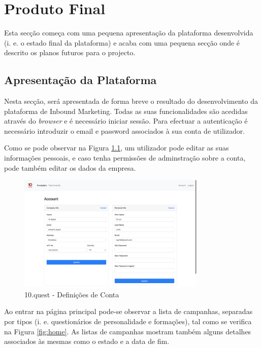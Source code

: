 \chapter{Produto Final}
\label{sec:produto-final}

Esta secção começa com uma pequena apresentação da plataforma desenvolvida (i. e. o estado final da plataforma) e acaba com uma pequena secção onde é descrito os planos futuros para o projecto.


\section{Apresentação da Plataforma}

Nesta secção, será apresentada de forma breve o resultado do desenvolvimento da plataforma de Inbound Marketing. Todas as suas funcionalidades são acedidas através do \textit{browser} e é necessário iniciar sessão. Para efectuar a autenticação é  necessário introduzir o email e password associados à sua conta de utilizador.

Como se pode observar  na Figura \ref{fig:account}, um utilizador pode editar as suas informações pessoais, e caso tenha permissões de adminstração sobre a conta, pode também editar os dados da empresa.

\begin{figure}[ht!]
	\begin{center}
		\includegraphics[width=0.8\textwidth]{img/product/account}
		\caption{10.quest - Definições de Conta}
		\label{fig:account}
	\end{center}
\end{figure}

\newpage


Ao entrar na página principal pode-se observar a lista de campanhas, separadas por tipos (i. e. questionários de personalidade e formações), tal como se verifica na Figura \ref{fig:home}. As listas de campanhas mostram também alguns detalhes associados às mesmas como o estado e a data de fim.

